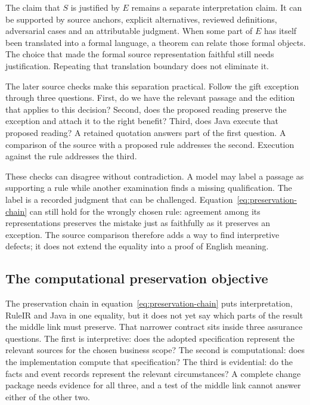 \documentclass[12pt,a4paper,oneside,openany]{book}
\begin{document}
The claim that $S$ is justified by $E$ remains a separate interpretation claim.
It can be supported by source anchors, explicit alternatives, reviewed
definitions, adversarial cases and an attributable judgment. When some part of
$E$ has itself been translated into a formal language, a theorem can relate
those formal objects. The choice that made the formal source representation
faithful still needs justification. Repeating that translation boundary does not
eliminate it.

The later source checks make this separation practical. Follow the gift
exception through three questions. First, do we have the relevant passage and
the edition that applies to this decision? Second, does the proposed reading
preserve the exception and attach it to the right benefit? Third, does Java
execute that proposed reading? A retained quotation answers part of the first
question. A comparison of the source with a proposed rule addresses the second.
Execution against the rule addresses the third.

These checks can disagree without contradiction. A model may label a passage
as supporting a rule while another examination finds a missing qualification.
The label is a recorded judgment that can be challenged. Equation~\eqref{eq:preservation-chain}
can still hold for the wrongly chosen rule: agreement among its representations
preserves the mistake just as faithfully as it preserves an exception. The
source comparison therefore adds a way to find interpretive defects; it does
not extend the equality into a proof of English meaning.


\subsection{The computational preservation objective}
\label{merge:P-03-product:05}

\label{sec:proof}

The preservation chain in equation~\eqref{eq:preservation-chain} puts interpretation, RuleIR and Java in one equality, but
it does not yet say which parts of the result the middle link must preserve. That narrower
contract sits inside three assurance questions. The first is interpretive: does the adopted
specification represent the relevant sources for the chosen business scope? The second is
computational: does the implementation compute that specification? The third is evidential:
do the facts and event records represent the relevant circumstances? A complete change package needs evidence for all three, and a test of the middle link cannot answer either of the other two.
\end{document}
